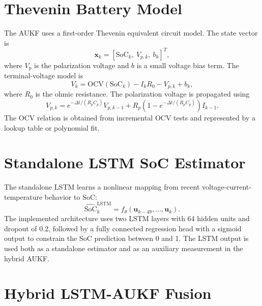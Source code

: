 \documentclass[lettersize,journal]{IEEEtran}
\begin{document}
\section{Thevenin Battery Model}
The AUKF uses a first-order Thevenin equivalent circuit model. The state vector is
\begin{equation}
    \mathbf{x}_k = [\mathrm{SoC}_k,\ V_{p,k},\ b_k]^T,
\end{equation}
where $V_p$ is the polarization voltage and $b$ is a small voltage bias term. The terminal-voltage model is
\begin{equation}
    V_k = \mathrm{OCV}(\mathrm{SoC}_k) - I_k R_0 - V_{p,k} + b_k,
    \label{eq:voltage_model}
\end{equation}
where $R_0$ is the ohmic resistance. The polarization voltage is propagated using
\begin{equation}
    V_{p,k} = e^{-\Delta t/(R_pC_p)}V_{p,k-1} + R_p\left(1-e^{-\Delta t/(R_pC_p)}\right)I_{k-1}.
    \label{eq:vp_model}
\end{equation}
The OCV relation is obtained from incremental OCV tests and represented by a lookup table or polynomial fit.

\section{Standalone LSTM SoC Estimator}
The standalone LSTM learns a nonlinear mapping from recent voltage-current-temperature behavior to SoC:
\begin{equation}
    \widehat{\mathrm{SoC}}^{\mathrm{LSTM}}_k = f_{\theta}\left(\mathbf{u}_{k-49},\ldots,\mathbf{u}_k\right).
\end{equation}
The implemented architecture uses two LSTM layers with 64 hidden units and dropout of 0.2, followed by a fully connected regression head with a sigmoid output to constrain the SoC prediction between 0 and 1. The LSTM output is used both as a standalone estimator and as an auxiliary measurement in the hybrid AUKF.

\section{Hybrid LSTM-AUKF Fusion}
\end{document}
